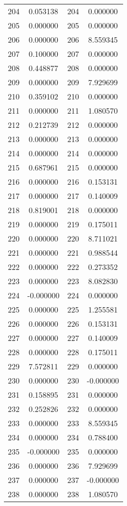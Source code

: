\documentclass[12pt]{article}
\begin{document}
\begin{longtable}{@{}cccc@{}}
204 & 0.053138 & 204 & 0.000000 \\
205 & 0.000000 & 205 & 0.000000 \\
206 & 0.000000 & 206 & 8.559345 \\
207 & 0.100000 & 207 & 0.000000 \\
208 & 0.448877 & 208 & 0.000000 \\
209 & 0.000000 & 209 & 7.929699 \\
210 & 0.359102 & 210 & 0.000000 \\
211 & 0.000000 & 211 & 1.080570 \\
212 & 0.212739 & 212 & 0.000000 \\
213 & 0.000000 & 213 & 0.000000 \\
214 & 0.000000 & 214 & 0.000000 \\
215 & 0.687961 & 215 & 0.000000 \\
216 & 0.000000 & 216 & 0.153131 \\
217 & 0.000000 & 217 & 0.140009 \\
218 & 0.819001 & 218 & 0.000000 \\
219 & 0.000000 & 219 & 0.175011 \\
220 & 0.000000 & 220 & 8.711021 \\
221 & 0.000000 & 221 & 0.988544 \\
222 & 0.000000 & 222 & 0.273352 \\
223 & 0.000000 & 223 & 8.082830 \\
224 & -0.000000 & 224 & 0.000000 \\
225 & 0.000000 & 225 & 1.255581 \\
226 & 0.000000 & 226 & 0.153131 \\
227 & 0.000000 & 227 & 0.140009 \\
228 & 0.000000 & 228 & 0.175011 \\
229 & 7.572811 & 229 & 0.000000 \\
230 & 0.000000 & 230 & -0.000000 \\
231 & 0.158895 & 231 & 0.000000 \\
232 & 0.252826 & 232 & 0.000000 \\
233 & 0.000000 & 233 & 8.559345 \\
234 & 0.000000 & 234 & 0.788400 \\
235 & -0.000000 & 235 & 0.000000 \\
236 & 0.000000 & 236 & 7.929699 \\
237 & 0.000000 & 237 & -0.000000 \\
238 & 0.000000 & 238 & 1.080570 \\

\end{longtable}
\end{document}
